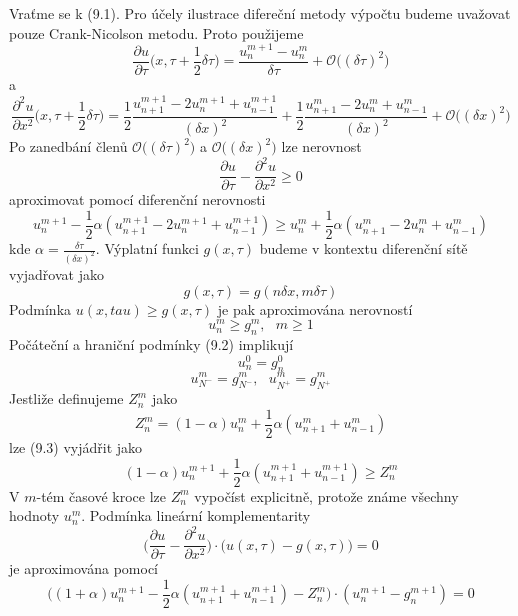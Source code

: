 \documentclass[a4paper]{book}
\begin{document}
Vraťme se k (9.1). Pro účely ilustrace difereční metody výpočtu budeme uvažovat pouze Crank-Nicolson metodu. Proto použijeme
\begin{equation*}
\frac{\partial u}{\partial \tau} \Big(x, \tau + \frac{1}{2} \delta \tau \Big) = \frac{u_n^{m+1} - u_n^m}{\delta \tau} + \mathcal{O}\Big( (\delta \tau)^2 \Big)
\end{equation*}
a
\begin{equation*}
\frac{\partial^2 u}{\partial x^2}\Big(x, \tau + \frac{1}{2} \delta \tau \Big) = \frac{1}{2}\frac{u_{n+1}^{m+1} - 2u_n^{m+1}+u_{n-1}^{m+1}}{(\delta x)^2} + \frac{1}{2}\frac{u_{n+1}^m - 2u_n^m + u_{n-1}^m}{(\delta x)^2} + \mathcal{O}\Big( (\delta x)^2 \Big)
\end{equation*}
Po zanedbání členů $\mathcal{O}\Big( (\delta \tau)^2 \Big)$ a $\mathcal{O}\Big( (\delta x)^2 \Big)$ lze nerovnost
\begin{equation*}
\frac{\partial u}{\partial \tau} - \frac{\partial^2 u}{\partial x^2} \ge 0
\end{equation*}
aproximovat pomocí diferenční nerovnosti
\begin{equation}
u_n^{m+1} - \frac{1}{2} \alpha (u_{n+1}^{m+1} - 2u_{n}^{m+1} + u_{n-1}^{m+1}) \ge u_n^m + \frac{1}{2} \alpha (u_{n+1}^m - 2u_{n}^m + u_{n-1}^m)
\end{equation}
kde $\alpha = \frac{\delta \tau}{(\delta x)^2}$. Výplatní funkci $g(x, \tau)$ budeme v kontextu diferenční sítě vyjadřovat jako
\begin{equation*}
g(x, \tau) = g(n \delta x, m \delta \tau)
\end{equation*}
Podmínka $u(x, tau) \ge g(x, \tau)$ je pak aproximována nerovností
\begin{equation}
u_n^m \ge g_n^m, ~~~ m \ge 1
\end{equation}
Počáteční a hraniční podmínky (9.2) implikují
\begin{equation}
u_n^0 = g_n^0
\end{equation}
\begin{equation}
u_{N^{-}}^m = g_{N^{-}}^m, ~~~ u_{N^{+}}^m = g_{N^{+}}^m
\end{equation}
Jestliže definujeme $Z_n^m$ jako
\begin{equation*}
Z_n^m = (1 - \alpha)u_n^m + \frac{1}{2} \alpha (u_{n+1}^m + u_{n-1}^m)
\end{equation*}
lze (9.3) vyjádřit jako
\begin{equation}
(1 - \alpha)u_n^{m+1} + \frac{1}{2} \alpha (u_{n+1}^{m+1} + u_{n-1}^{m+1}) \ge Z_n^m 
\end{equation}
V $m$-tém časové kroce lze $Z_n^m$ vypočíst explicitně, protože známe všechny hodnoty $u_n^m$. Podmínka lineární komplementarity
\begin{equation*}
\Bigg( \frac{\partial u}{\partial \tau} - \frac{\partial^2 u}{\partial x^2} \Bigg) \cdot \Big( u(x, \tau) - g(x, \tau) \Big) = 0
\end{equation*}
je aproximována pomocí
\begin{equation}
\Big((1 + \alpha)u_n^{m+1}-\frac{1}{2}\alpha(u_{n+1}^{m+1} + u_{n-1}^{m+1}) - Z_n^m \Big) \cdot (u_n^{m+1} - g_n^{m+1}) = 0
\end{equation}
\end{document}
